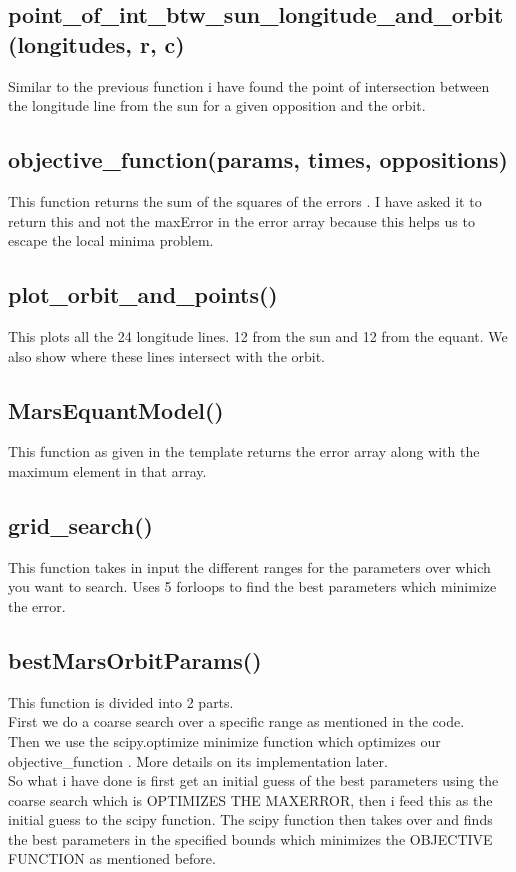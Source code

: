 \documentclass{article}
\begin{document}
\subsection{point\_of\_int\_btw\_sun\_longitude\_and\_orbit(longitudes, r, c)}
Similar to the previous function i have found the point of intersection between the longitude line from the sun for a given opposition and the orbit.

\subsection{objective\_function(params, times, oppositions)}
This function returns the sum of the squares of the errors .
I have asked it to return this and not the maxError in the error array because this helps us to escape the local minima problem.

\subsection{plot\_orbit\_and\_points()}
This plots all the 24 longitude lines. 12 from the sun and 12 from the equant. We also show where these lines intersect with the orbit. \\

\subsection{MarsEquantModel()}
This function as given in the template returns the error array along with the maximum element in that array.

\subsection{grid\_search()}
This function takes in input the different ranges for the parameters over which you want to search. Uses 5 forloops to find the best parameters which minimize the error.\\

\subsection{bestMarsOrbitParams()}
This function is divided into 2 parts.\\
First we do a coarse search over a specific range as mentioned in the code.\\
Then we use the scipy.optimize minimize function which optimizes our objective\_function . More details on its implementation later.\\
So what i have done is first get an initial guess of the best parameters using the coarse search which is OPTIMIZES THE MAXERROR, then i feed this as the initial guess to the scipy function. The scipy function then takes over and finds the best parameters in the specified bounds which minimizes the OBJECTIVE FUNCTION as mentioned before.
\newpage
\end{document}

